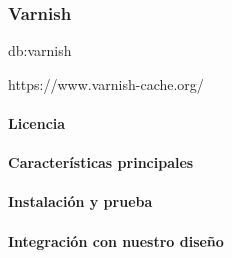 \subsubsection{Varnish}
\label{soa:tecnologias:varnish}

\gls{db:varnish}

https://www.varnish-cache.org/

\paragraph{Licencia}

\paragraph{Características principales}

\paragraph{Instalación y prueba}

\paragraph{Integración con nuestro diseño}
